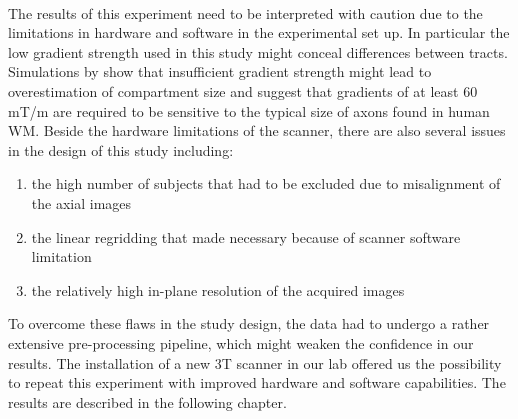\paragraph{} The results of this experiment need to be interpreted with caution due to the limitations in hardware and software in the experimental set up. In particular the low gradient strength used in this study might conceal differences between tracts. Simulations by \citet{Latt:2007} show that insufficient gradient strength might lead to overestimation of compartment size and suggest that gradients of at least 60 mT/m are required to be sensitive to the typical size of axons found in human WM. Beside the hardware limitations of the scanner, there are also several issues in the design of this study including:
\begin{enumerate}
	\item the high number of subjects that had to be excluded due to misalignment of the axial images
	\item the linear regridding that made necessary because of scanner software limitation
	\item the relatively high in-plane resolution of the acquired images
\end{enumerate}
To overcome these flaws in the study design, the data had to undergo a rather extensive pre-processing pipeline, which might weaken the confidence in our results. The installation of a new 3T scanner in our lab offered us the possibility to repeat this experiment with improved hardware and software capabilities. The results are described in the following chapter.


